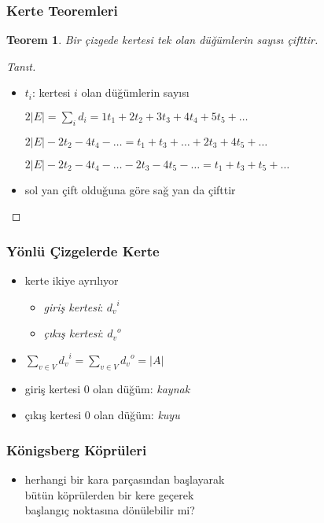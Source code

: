 \documentclass[dvipsnames]{beamer}
\theoremstyle{definition}
\theoremstyle{example}
\theoremstyle{plain}
\newtheorem{teorem}[theorem]{Teorem}
\begin{document}
\begin{frame}
  \frametitle{Kerte Teoremleri}

  \begin{teorem}
    Bir çizgede kertesi tek olan düğümlerin sayısı çifttir.
  \end{teorem}

  \pause
  \begin{proof}[Tanıt]
    \begin{itemize}
      \item $t_i$: kertesi $i$ olan düğümlerin sayısı

      \pause
$2|E| = \sum_i d_i = 1t_1 + 2t_2 + 3t_3 + 4t_4 + 5t_5 + \dots$

\pause
$2|E| - 2t_2 - 4t_4 - \dots = t_1 + t_3 + \dots + 2t_3 + 4t_5 + \dots$

\pause
$2|E| - 2t_2 - 4t_4 - \dots - 2t_3 - 4t_5 - \dots = t_1 + t_3 + t_5 + \dots$

      \pause
      \item sol yan çift olduğuna göre sağ yan da çifttir
    \end{itemize}
  \end{proof}
\end{frame}

\begin{frame}
  \frametitle{Yönlü Çizgelerde Kerte}

  \begin{itemize}
    \item kerte ikiye ayrılıyor
    \begin{itemize}
      \item \emph{giriş kertesi}: ${d_v}^i$
      \item \emph{çıkış kertesi}: ${d_v}^o$
    \end{itemize}

    \pause
    \item $\sum_{v \in V} {d_v}^i = \sum_{v \in V} {d_v}^o = |A|$

    \pause
    \medskip
    \item giriş kertesi 0 olan düğüm: \emph{kaynak}
    \item çıkış kertesi 0 olan düğüm: \emph{kuyu}
  \end{itemize}
\end{frame}

\begin{frame}
  \frametitle{Königsberg Köprüleri}

  \begin{center}
  \end{center}

  \begin{itemize}
    \item herhangi bir kara parçasından başlayarak\\
      bütün köprülerden bir kere geçerek\\
      başlangıç noktasına dönülebilir mi?
  \end{itemize}
\end{frame}
\end{document}

